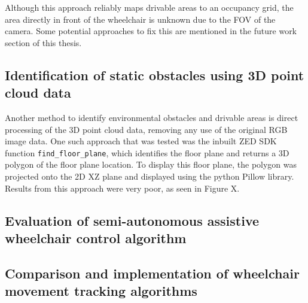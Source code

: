 Although this approach reliably maps drivable areas to an occupancy grid,
the area directly in front of the wheelchair is unknown due to the FOV of the camera.
Some potential approaches to fix this are mentioned in the future work section of this thesis.

\subsection{Identification of static obstacles using 3D point cloud data}
Another method to identify environmental obstacles and drivable areas
is direct processing of the 3D point cloud data, removing any use of the original RGB image data.
One such approach that was tested was the inbuilt ZED SDK function \texttt{find_floor_plane},
which identifies the floor plane and returns a 3D polygon of the floor plane location.
To display this floor plane, the polygon was projected onto the 2D XZ plane and displayed
using the python Pillow library. Results from this approach were very poor,
as seen in Figure X.

\subsection{Evaluation of semi-autonomous assistive wheelchair control algorithm}

\subsection{Comparison and implementation of wheelchair movement tracking algorithms}
